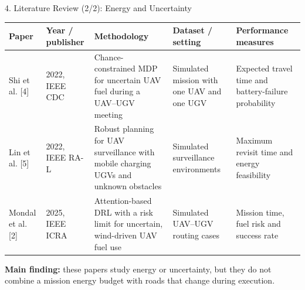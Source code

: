 \documentclass[aspectratio=169,10pt]{beamer}
\begin{document}
\begin{frame}{4. Literature Review (2/2): Energy and Uncertainty}
\scriptsize
\setlength{\tabcolsep}{2pt}
\renewcommand{\arraystretch}{1.35}
\begin{tabular}{P{1.9cm}P{1.5cm}P{3.7cm}P{3.0cm}P{3.1cm}}
\toprule
\textbf{Paper} & \textbf{Year / publisher} & \textbf{Methodology} & \textbf{Dataset / setting} & \textbf{Performance measures}\\
\midrule
Shi et al. [4] & 2022, IEEE CDC & Chance-constrained MDP for uncertain UAV fuel during a UAV--UGV meeting & Simulated mission with one UAV and one UGV & Expected travel time and battery-failure probability\\
\addlinespace
Lin et al. [5] & 2022, IEEE RA-L & Robust planning for UAV surveillance with mobile charging UGVs and unknown obstacles & Simulated surveillance environments & Maximum revisit time and energy feasibility\\
\addlinespace
Mondal et al. [2] & 2025, IEEE ICRA & Attention-based DRL with a risk limit for uncertain, wind-driven UAV fuel use & Simulated UAV--UGV routing cases & Mission time, fuel risk and success rate\\
\bottomrule
\end{tabular}

\vspace{3mm}
\footnotesize
\textbf{Main finding:} these papers study energy or uncertainty, but they do not combine a mission energy budget with roads that change during execution.
\end{frame}
\end{document}
